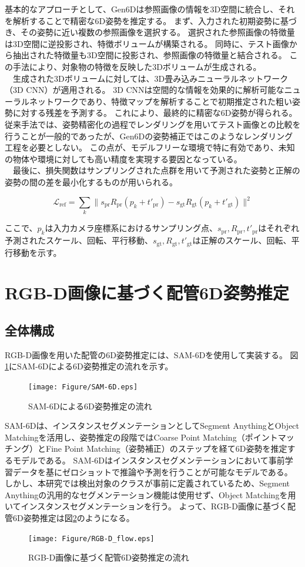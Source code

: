 基本的なアプローチとして、Gen6Dは参照画像の情報を3D空間に統合し、それを解析することで精密な6D姿勢を推定する。
まず、入力された初期姿勢に基づき、その姿勢に近い複数の参照画像を選択する。
選択された参照画像の特徴量は3D空間に逆投影され、特徴ボリュームが構築される。
同時に、テスト画像から抽出された特徴量も3D空間に投影され、参照画像の特徴量と結合される。
この手法により、対象物の特徴を反映した3Dボリュームが生成される。\\
　生成された3Dボリュームに対しては、3D畳み込みニューラルネットワーク（3D CNN）が適用される。
3D CNNは空間的な情報を効果的に解析可能なニューラルネットワークであり、特徴マップを解析することで初期推定された粗い姿勢に対する残差を予測する。
これにより、最終的に精密な6D姿勢が得られる。
従来手法では、姿勢精密化の過程でレンダリングを用いてテスト画像との比較を行うことが一般的であったが、Gen6Dの姿勢補正ではこのようなレンダリング工程を必要としない。
この点が、モデルフリーな環境で特に有効であり、未知の物体や環境に対しても高い精度を実現する要因となっている。\\
　最後に、損失関数はサンプリングされた点群を用いて予測された姿勢と正解の姿勢の間の差を最小化するものが用いられる。

\[
\mathcal{L}_{\text{ref}} = \sum_{k} \|s_{\text{pr}} R_{\text{pr}} (p_k + t'_{\text{pr}}) - s_{\text{gt}} R_{\text{gt}} (p_k + t'_{\text{gt}})\|^2
\]

ここで、\(p_k\)は入力カメラ座標系におけるサンプリング点、\(s_{\text{pr}}, R_{\text{pr}}, t'_{\text{pr}}\)はそれぞれ予測されたスケール、回転、平行移動、\(s_{\text{gt}}, R_{\text{gt}}, t'_{\text{gt}}\)は正解のスケール、回転、平行移動を示す。


\section{RGB-D画像に基づく配管6D姿勢推定}
\subsection{全体構成}
RGB-D画像を用いた配管の6D姿勢推定には、SAM-6Dを使用して実装する。
図\ref{fig:f6}にSAM-6Dによる6D姿勢推定の流れを示す。
\begin{figure}[htbt]
	\centering
	 \texttt{[image: Figure/SAM-6D.eps]}
	 \caption{SAM-6Dによる6D姿勢推定の流れ}
	 \label{fig:f6}
\end{figure}

SAM-6Dは、インスタンスセグメンテーションとしてSegment AnythingとObject Matchingを活用し、姿勢推定の段階ではCoarse Point Matching（ポイントマッチング）とFine Point Matching（姿勢補正）のステップを経て6D姿勢を推定するモデルである。
SAM-6Dはインスタンスセグメンテーションにおいて事前学習データを基にゼロショットで推論や予測を行うことが可能なモデルである。
しかし、本研究では検出対象のクラスが事前に定義されているため、Segment Anythingの汎用的なセグメンテーション機能は使用せず、Object Matchingを用いてインスタンスセグメンテーションを行う。
よって、RGB-D画像に基づく配管6D姿勢推定は図\ref{fig:f7}のようになる。
\begin{figure}[htbt]
	\centering
	 \texttt{[image: Figure/RGB-D\_flow.eps]}
	 \caption{RGB-D画像に基づく配管6D姿勢推定の流れ}
	 \label{fig:f7}
\end{figure}


